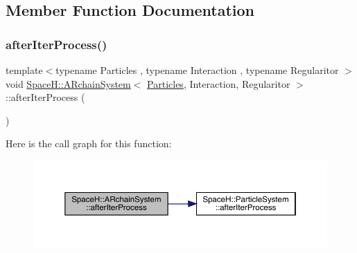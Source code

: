 \subsection{Member Function Documentation}
\mbox{\label{class_space_h_1_1_a_rchain_system_a2a0f231485f166cf9037a06a4b83e8ca}} 
\subsubsection{\texorpdfstring{after\+Iter\+Process()}{afterIterProcess()}}
{\footnotesize\ttfamily template$<$typename Particles , typename Interaction , typename Regularitor $>$ \\
void \mbox{\hyperlink{class_space_h_1_1_a_rchain_system}{Space\+H\+::\+A\+Rchain\+System}}$<$ \mbox{\hyperlink{struct_space_h_1_1_particles}{Particles}}, Interaction, Regularitor $>$\+::after\+Iter\+Process (\begin{DoxyParamCaption}{ }\end{DoxyParamCaption})\hspace{0.3cm}{\ttfamily [inline]}}

Here is the call graph for this function\+:
\nopagebreak
\begin{figure}[H]
\begin{center}
\leavevmode
\includegraphics[width=350pt]{class_space_h_1_1_a_rchain_system_a2a0f231485f166cf9037a06a4b83e8ca_cgraph}
\end{center}
\end{figure}
\mbox{\label{class_space_h_1_1_a_rchain_system_adf6a2220ead064e01251a74ecbd7eb41}} 
